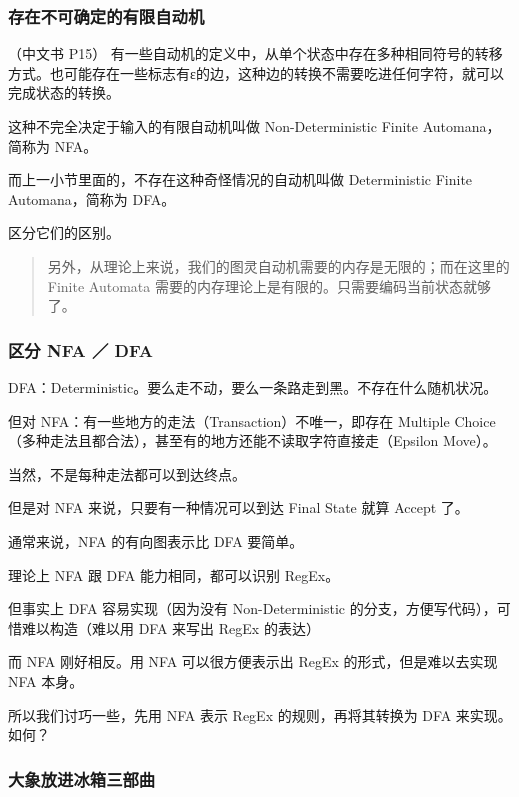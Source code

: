 \documentclass[
]{article}
\begin{document}
\hypertarget{header-n25}{%
\subsubsection{存在不可确定的有限自动机}\label{header-n25}}

（中文书 P15）
有一些自动机的定义中，从单个状态中存在多种相同符号的转移方式。也可能存在一些标志有ε的边，这种边的转换不需要吃进任何字符，就可以完成状态的转换。

这种不完全决定于输入的有限自动机叫做 Non-Deterministic Finite
Automana，简称为 NFA。

而上一小节里面的，不存在这种奇怪情况的自动机叫做 Deterministic Finite
Automana，简称为 DFA。

区分它们的区别。

\begin{quote}
另外，从理论上来说，我们的图灵自动机需要的内存是无限的；而在这里的
Finite Automata 需要的内存理论上是有限的。只需要编码当前状态就够了。
\end{quote}

\hypertarget{header-n32}{%
\subsubsection{区分 NFA ／ DFA}\label{header-n32}}

DFA：Deterministic。要么走不动，要么一条路走到黑。不存在什么随机状况。

但对 NFA：有一些地方的走法（Transaction）不唯一，即存在 Multiple
Choice（多种走法且都合法），甚至有的地方还能不读取字符直接走（Epsilon
Move）。

当然，不是每种走法都可以到达终点。

但是对 NFA 来说，只要有一种情况可以到达 Final State 就算 Accept 了。

通常来说，NFA 的有向图表示比 DFA 要简单。

理论上 NFA 跟 DFA 能力相同，都可以识别 RegEx。

但事实上 DFA 容易实现（因为没有 Non-Deterministic
的分支，方便写代码），可惜难以构造（难以用 DFA 来写出 RegEx 的表达）

而 NFA 刚好相反。用 NFA 可以很方便表示出 RegEx 的形式，但是难以去实现
NFA 本身。

所以我们讨巧一些，先用 NFA 表示 RegEx 的规则，再将其转换为 DFA
来实现。如何？

\hypertarget{header-n42}{%
\subsubsection{大象放进冰箱三部曲}\label{header-n42}}
\end{document}
